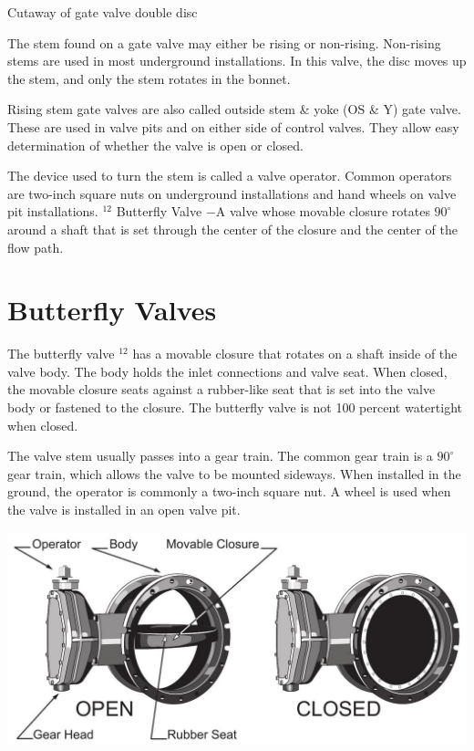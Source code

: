 \documentclass[10pt]{article}
\begin{document}
Cutaway of gate valve double disc

The stem found on a gate valve may either be rising or non-rising. Non-rising stems are used in most underground installations. In this valve, the disc moves up the stem, and only the stem rotates in the bonnet.

Rising stem gate valves are also called outside stem \& yoke (OS \& Y) gate valve. These are used in valve pits and on either side of control valves. They allow easy determination of whether the valve is open or closed.

The device used to turn the stem is called a valve operator. Common operators are two-inch square nuts on underground installations and hand wheels on valve pit installations. ${ }^{12}$ Butterfly Valve $-\mathrm{A}$ valve whose movable closure rotates $90^{\circ}$ around a shaft that is set through the center of the closure and the center of the flow path.

\section{Butterfly Valves}
The butterfly valve ${ }^{12}$ has a movable closure that rotates on a shaft inside of the valve body. The body holds the inlet connections and valve seat. When closed, the movable closure seats against a rubber-like seat that is set into the valve body or fastened to the closure. The butterfly valve is not 100 percent watertight when closed.

The valve stem usually passes into a gear train. The common gear train is a $90^{\circ}$ gear train, which allows the valve to be mounted sideways. When installed in the ground, the operator is commonly a two-inch square nut. A wheel is used when the valve is installed in an open valve pit.

\includegraphics[max width=\textwidth]{ButterflyValveOperation}
\end{document}
